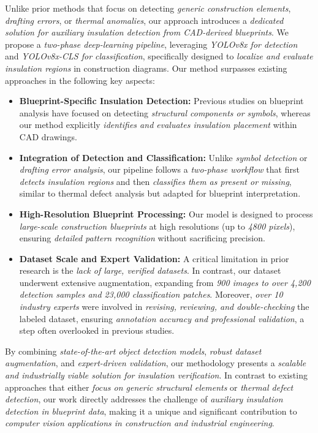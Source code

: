 \documentclass[]{IEEEphot}
\begin{document}
Unlike prior methods that focus on detecting \textit{generic construction elements}, \textit{drafting errors}, or \textit{thermal anomalies}, our approach introduces a \textit{dedicated solution for auxiliary insulation detection from CAD-derived blueprints}. We propose a \textit{two-phase deep-learning pipeline}, leveraging \textit{YOLOv8x for detection} and \textit{YOLOv8x-CLS for classification}, specifically designed to \textit{localize and evaluate insulation regions} in construction diagrams. Our method surpasses existing approaches in the following key aspects:  

\begin{itemize}
    \item \textbf{Blueprint-Specific Insulation Detection:} Previous studies on blueprint analysis have focused on detecting \textit{structural components or symbols}, whereas our method explicitly \textit{identifies and evaluates insulation placement} within CAD drawings.  
    \item \textbf{Integration of Detection and Classification:} Unlike \textit{symbol detection} or \textit{drafting error analysis}, our pipeline follows a \textit{two-phase workflow} that first \textit{detects insulation regions} and then \textit{classifies them as present or missing}, similar to thermal defect analysis but adapted for blueprint interpretation.  
    \item \textbf{High-Resolution Blueprint Processing:} Our model is designed to process \textit{large-scale construction blueprints} at high resolutions (up to \textit{4800 pixels}), ensuring \textit{detailed pattern recognition} without sacrificing precision.  
    \item \textbf{Dataset Scale and Expert Validation:} A critical limitation in prior research is the \textit{lack of large, verified datasets}. In contrast, our dataset underwent extensive augmentation, expanding from \textit{900 images to over 4,200 detection samples and 23,000 classification patches}. Moreover, \textit{over 10 industry experts} were involved in \textit{revising, reviewing, and double-checking} the labeled dataset, ensuring \textit{annotation accuracy and professional validation}, a step often overlooked in previous studies.  
\end{itemize}  

By combining \textit{state-of-the-art object detection models}, \textit{robust dataset augmentation}, and \textit{expert-driven validation}, our methodology presents a \textit{scalable and industrially viable solution for insulation verification}. In contrast to existing approaches that either \textit{focus on generic structural elements} or \textit{thermal defect detection}, our work directly addresses the challenge of \textit{auxiliary insulation detection in blueprint data}, making it a unique and significant contribution to \textit{computer vision applications in construction and industrial engineering}.  
\end{document}
